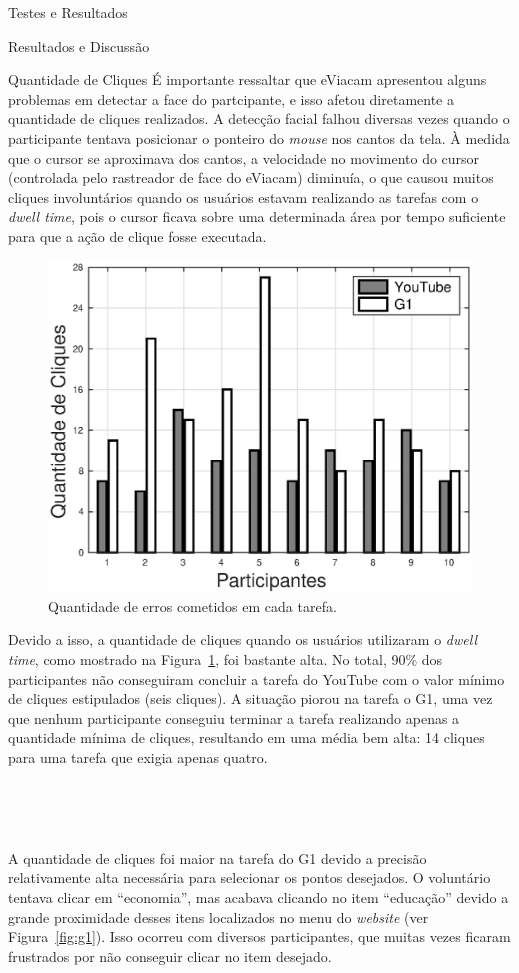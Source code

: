 \begin{chapter}{Testes e Resultados}
\begin{section}{Resultados e Discussão}
\begin{subsection}{Quantidade de Cliques}
É importante ressaltar que eViacam apresentou alguns problemas em detectar a
face do partcipante, e isso afetou diretamente a quantidade de cliques
realizados. A detecção facial falhou diversas vezes quando o participante
tentava posicionar o ponteiro do \textit{mouse} nos cantos da tela. À medida que
o cursor se aproximava dos cantos, a velocidade no movimento do cursor
(controlada pelo rastreador de face do eViacam) diminuía, o que causou muitos
cliques involuntários quando os usuários estavam realizando as tarefas com o
\textit{dwell time}, pois o cursor ficava sobre uma determinada área por tempo
suficiente para que a ação de clique fosse executada.

\begin{figure}[!h]
	\centering
	\includegraphics[width=.7\linewidth]{fig/DwellClicks}
	\caption{Quantidade de erros cometidos em cada tarefa.}
	\label{fig:dwellclicks}
\end{figure}

Devido a isso, a quantidade de cliques quando os usuários utilizaram o
\textit{dwell time}, como mostrado na Figura~\ref{fig:dwellclicks}, foi bastante
alta. No total, 90\% dos participantes não conseguiram concluir a tarefa do
YouTube com o valor mínimo de cliques estipulados (seis cliques). A situação
piorou na tarefa o G1, uma vez que nenhum participante conseguiu terminar a
tarefa realizando apenas a quantidade mínima de cliques, resultando em uma média 
bem alta: 14 cliques para uma tarefa que exigia apenas quatro.

~

~
  
A quantidade de cliques foi maior na tarefa do G1 devido a precisão
relativamente alta necessária para selecionar os pontos desejados. O voluntário
tentava clicar em ``economia'', mas acabava clicando no item ``educação'' devido
a grande proximidade desses itens localizados no menu do \textit{website}
(ver Figura~\ref{fig:g1}). Isso ocorreu com diversos participantes, que muitas
vezes ficaram frustrados por não conseguir clicar no item desejado.


\end{subsection}
\end{section}
\end{chapter}
